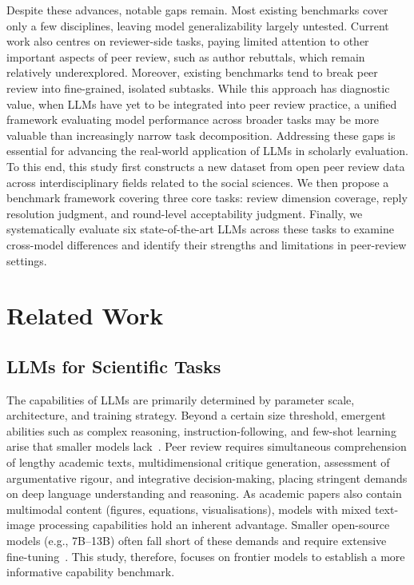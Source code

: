 \documentclass[preprint,10pt,times]{elsarticle}
\begin{document}
Despite these advances, notable gaps remain. Most existing benchmarks cover only a few disciplines, leaving model generalizability largely untested. Current work also centres on reviewer-side tasks, paying limited attention to other important aspects of peer review, such as author rebuttals, which remain relatively underexplored. Moreover, existing benchmarks tend to break peer review into fine-grained, isolated subtasks. While this approach has diagnostic value, when LLMs have yet to be integrated into peer review practice, a unified framework evaluating model performance across broader tasks may be more valuable than increasingly narrow task decomposition. Addressing these gaps is essential for advancing the real-world application of LLMs in scholarly evaluation. To this end, this study first constructs a new dataset from open peer review data across interdisciplinary fields related to the social sciences. We then propose a benchmark framework covering three core tasks: review dimension coverage, reply resolution judgment, and round-level acceptability judgment. Finally, we systematically evaluate six state-of-the-art LLMs across these tasks to examine cross-model differences and identify their strengths and limitations in peer-review settings.

\section{Related Work}
\label{sec:related}

\subsection{LLMs for Scientific Tasks}
\label{sec:llms-sci}

The capabilities of LLMs are primarily determined by parameter scale, architecture, and training strategy. Beyond a certain size threshold, emergent abilities such as complex reasoning, instruction-following, and few-shot learning arise that smaller models lack~\cite{ref11}. Peer review requires simultaneous comprehension of lengthy academic texts, multidimensional critique generation, assessment of argumentative rigour, and integrative decision-making, placing stringent demands on deep language understanding and reasoning. As academic papers also contain multimodal content (figures, equations, visualisations), models with mixed text-image processing capabilities hold an inherent advantage. Smaller open-source models (e.g., 7B--13B) often fall short of these demands and require extensive fine-tuning~\cite{ref12,ref13}. This study, therefore, focuses on frontier models to establish a more informative capability benchmark.
\end{document}
